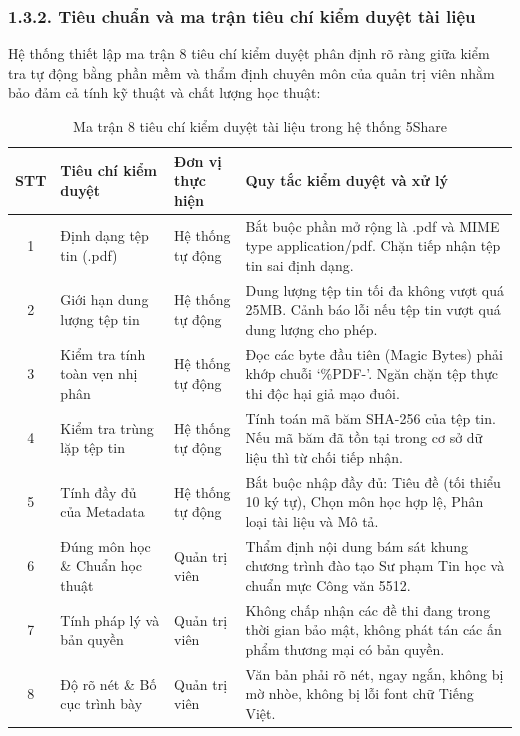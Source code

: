 \subsubsection{1.3.2. Tiêu chuẩn và ma trận tiêu chí kiểm duyệt tài liệu}
Hệ thống thiết lập ma trận 8 tiêu chí kiểm duyệt phân định rõ ràng giữa kiểm tra tự động bằng phần mềm và thẩm định chuyên môn của quản trị viên nhằm bảo đảm cả tính kỹ thuật và chất lượng học thuật:

\begin{table}[H]
\centering
\small
\renewcommand{\arraystretch}{1.25}
\begin{tabularx}{\textwidth}{|c|p{3.8cm}|p{2.8cm}|X|}
\hline
\rowcolor[HTML]{EAEAEA}
\textbf{STT} & \textbf{Tiêu chí kiểm duyệt} & \textbf{Đơn vị thực hiện} & \textbf{Quy tắc kiểm duyệt và xử lý} \\
\hline
1 & Định dạng tệp tin (.pdf) & Hệ thống tự động & Bắt buộc phần mở rộng là .pdf và MIME type application/pdf. Chặn tiếp nhận tệp tin sai định dạng. \\
\hline
2 & Giới hạn dung lượng tệp tin & Hệ thống tự động & Dung lượng tệp tin tối đa không vượt quá 25MB. Cảnh báo lỗi nếu tệp tin vượt quá dung lượng cho phép. \\
\hline
3 & Kiểm tra tính toàn vẹn nhị phân & Hệ thống tự động & Đọc các byte đầu tiên (Magic Bytes) phải khớp chuỗi `\%PDF-'. Ngăn chặn tệp thực thi độc hại giả mạo đuôi. \\
\hline
4 & Kiểm tra trùng lặp tệp tin & Hệ thống tự động & Tính toán mã băm SHA-256 của tệp tin. Nếu mã băm đã tồn tại trong cơ sở dữ liệu thì từ chối tiếp nhận. \\
\hline
5 & Tính đầy đủ của Metadata & Hệ thống tự động & Bắt buộc nhập đầy đủ: Tiêu đề (tối thiểu 10 ký tự), Chọn môn học hợp lệ, Phân loại tài liệu và Mô tả. \\
\hline
6 & Đúng môn học \& Chuẩn học thuật & Quản trị viên & Thẩm định nội dung bám sát khung chương trình đào tạo Sư phạm Tin học và chuẩn mực Công văn 5512. \\
\hline
7 & Tính pháp lý và bản quyền & Quản trị viên & Không chấp nhận các đề thi đang trong thời gian bảo mật, không phát tán các ấn phẩm thương mại có bản quyền. \\
\hline
8 & Độ rõ nét \& Bố cục trình bày & Quản trị viên & Văn bản phải rõ nét, ngay ngắn, không bị mờ nhòe, không bị lỗi font chữ Tiếng Việt. \\
\hline
\end{tabularx}
\caption{Ma trận 8 tiêu chí kiểm duyệt tài liệu trong hệ thống 5Share}
\label{tab:ma_tran_kiem_duyet}
\end{table}

